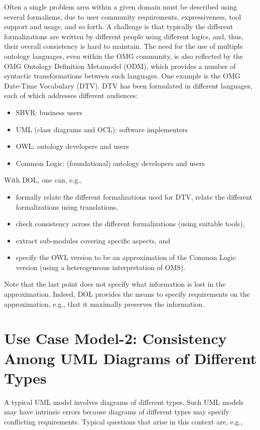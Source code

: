\documentclass[10pt,fleqn,%
\ifpretendfinal
final%
\else
draft%
\fi,
]{scrreprt}
\begin{document}
Often a single problem area within a given domain must be described using several formalisms, due to user community requirements, expressiveness, tool support 
and usage, and so forth. A challenge is that typically the different formalizations are written by different people using different logics, and, thus, their overall 
consistency is hard to maintain.
The need for the use of multiple ontology languages, even within the OMG community, is also reflected by the OMG Ontology Definition Metamodel (ODM), which 
provides a number of syntactic transformations between such languages.
One example is the OMG Date-Time Vocabulary (DTV). DTV has been formulated in different languages, each of which addresses different audiences:
\begin{itemize}
\item	 SBVR: business users
\item 	UML (class diagrams and OCL): software implementers
\item 	OWL: ontology developers and users
\item 	Common Logic: (foundational) ontology developers and users
\end{itemize}
With DOL, one can, e.g.,
\begin{itemize}
\item 	formally relate the different formalizations used for DTV, relate the different formalizations using translations,
\item 	check consistency across the different formalizations (using suitable tools),
\item 	extract sub-modules covering specific aspects, and
\item 	specify the OWL version to be an approximation of the Common Logic version (using a heterogeneous interpretation of OMS).
\end{itemize}
Note that the last point does not specify what information is lost in the approximation. Indeed, DOL provides the means to specify requirements on the approximation, e.g., that it maximally preserves the information. 

\section{Use Case Model-2: Consistency Among UML Diagrams of Different Types}

A typical UML model involves diagrams of different types. Such UML models may have intrinsic errors because diagrams of different types may specify conflicting 
requirements. Typical questions that arise in this context are, e.g.,
\end{document}

